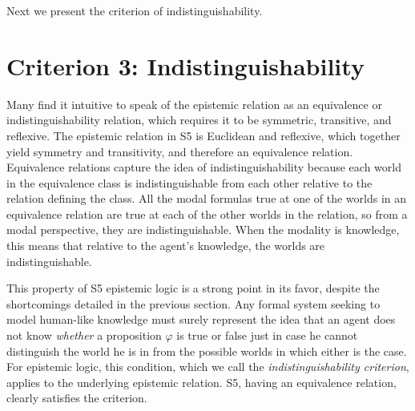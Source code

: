 
Next we present the criterion of indistinguishability.

\section{Criterion 3: Indistinguishability}
\label{sec:indist}
Many find it intuitive to speak of the epistemic relation as an equivalence or indistinguishability relation, which requires it to be symmetric, transitive, and reflexive. The epistemic relation in S5 is Euclidean and reflexive, which together yield symmetry and transitivity, and therefore an equivalence relation. Equivalence relations capture the idea of indistinguishability because each world in the equivalence class is indistinguishable from each other relative to the relation defining the class. All the modal formulas true at one of the worlds in an equivalence relation are true at each of the other worlds in the relation, so from a modal perspective, they are indistinguishable. When the modality is knowledge, this means that relative to the agent's knowledge, the worlds are indistinguishable. 

This property of S5 epistemic logic is a strong point in its favor, despite the shortcomings detailed in the previous section. Any formal system seeking to model human-like knowledge must surely represent the idea that an agent does not know \emph{whether} a proposition $\varphi$ is true or false just in case he cannot distinguish the world he is in from the possible worlds in which either is the case. For epistemic logic, this condition, which we call the \emph{indistinguishability criterion}, applies to the underlying epistemic relation. S5, having an equivalence relation, clearly satisfies the criterion.

